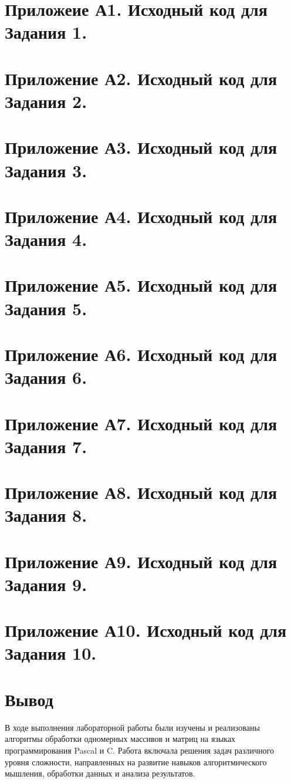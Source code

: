 \documentclass[oneside,a4paper,14pt]{extarticle}
\begin{document}
\section*{Приложеие А1. Исходный код для Задания 1.}
\section*{Приложение А2. Исходный код для Задания 2.}
\section*{Приложение А3. Исходный код для Задания 3.}
\section*{Приложение А4. Исходный код для Задания 4.}
\section*{Приложение А5. Исходный код для Задания 5.}
\section*{Приложение А6. Исходный код для Задания 6.}
\section*{Приложение А7. Исходный код для Задания 7.}
\section*{Приложение А8. Исходный код для Задания 8.}
\section*{Приложение А9. Исходный код для Задания 9.}
\section*{Приложение А10. Исходный код для Задания 10.}

\section*{Вывод}
В ходе выполнения лабораторной работы были изучены и реализованы алгоритмы
обработки одномерных массивов и матриц на языках программирования Pascal и C.
Работа включала решения задач различного уровня сложности, направленных на
развитие навыков алгоритмического мышления, обработки данных и анализа
результатов.\\
\end{document}
